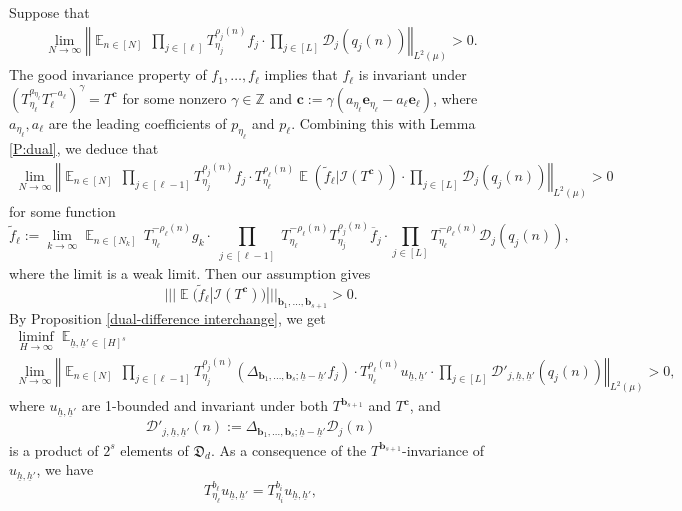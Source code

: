 \documentclass[11pt]{amsart}
\theoremstyle{definition}
\newcommand{\Z}{{\mathbb Z}}
\newcommand{\CD}{{\mathcal D}}
\newcommand{\CI}{{\mathcal I}}
\newcommand{\FD}{{\mathfrak D}}
\newcommand{\bc}{{\mathbf{c}}}
\newcommand{\be}{{\mathbf{e}}}
\renewcommand{\b}{{\textbf{b}}}
\newcommand{\uh}{{\underline{h}}}
\newcommand{\norm}[1]{\left\Vert #1\right\Vert}
\newcommand{\nnorm}[1]{\lvert\!|\!| #1|\!|\!\rvert}
\DeclareMathOperator*{\E}{\mathbb{E}}
\newcommand{\brac}[1]{\mathopen{}\left( #1 \mathclose{}\right)}
\begin{document}
Suppose that
\begin{align}\label{general average is positive 2}
    \lim_{N\to\infty}\norm{\E_{n\in [N]} \,\prod_{j\in[\ell]}T_{{\eta_j}}^{\rho_j(n)}f_j \cdot \prod_{j\in[L]}\CD_{j}(q_j(n))}_{L^2(\mu)}>0.
\end{align}
The good invariance property  of $f_1, \ldots, f_\ell$ implies that $f_\ell$ is invariant under $\brac{T_{\eta_\ell}^{a_{\eta_\ell}}T_\ell^{-a_\ell}}^\gamma = T^{\bc}$ for some nonzero $\gamma\in\Z$ and $\bc := \gamma(a_{\eta_\ell}\be_{\eta_\ell}-a_\ell\be_\ell)$, where $a_{\eta_\ell}, a_\ell$ are the leading coefficients of $p_{\eta_\ell}$ and $p_\ell$.
Combining this with Lemma \ref{P:dual}, we deduce that
\begin{align*}
	\lim_{N\to\infty}\norm{\E_{n\in [N]} \,\prod_{j\in[\ell-1]}T_{{\eta_j}}^{\rho_j(n)}f_j \cdot T_{\eta_\ell}^{\rho_\ell(n)}\E(\tilde{f}_\ell|\CI(T^\bc))\cdot \prod_{j\in[L]}\CD_{j}(q_j(n))}_{L^2(\mu)}>0
\end{align*}
for some function
	\begin{equation*}
	\tilde{f}_\ell:=\lim_{k\to\infty} \E_{n\in [N_k]}
	 \, T_{\eta_\ell}^{-\rho_\ell(n)}g_k\cdot \prod_{\substack{j\in [\ell-1]}}T_{\eta_\ell}^{-\rho_\ell(n)} T_{{\eta_j}}^{\rho_j(n)}\overline{f}_j\cdot \prod_{j\in[L]}T_{\eta_\ell}^{-\rho_\ell(n)}\CD_{j}(q_j(n)),
	\end{equation*}
where the limit is a weak limit. Then our assumption gives
$$
\nnorm{\E(\tilde{f}_\ell|\CI(T^\bc))}_{{\b_1}, \ldots, {\b_{s+1}}}>0.
$$
By Proposition \ref{dual-difference interchange}, we get
\begin{multline*}
\liminf_{H\to\infty}\E_{\uh,\uh'\in [H]^{s}}\\
\lim_{N\to\infty}\norm{\E_{n\in[N]} \, \prod_{j\in[\ell-1]} T_{{\eta_j}}^{\rho_j(n)} (\Delta_{{\b_1}, \ldots, {\b_s}; \uh-\uh'} f_j)\cdot T_{\eta_\ell}^{\rho_\ell(n)}u_{\uh,\uh'}\cdot \prod_{j\in[L]} \CD'_{j, \uh, \uh'}(q_j(n))}_{L^2(\mu)}>0,
\end{multline*}
where $u_{\uh,\uh'}$ are 1-bounded and invariant under both $T^{\b_{s+1}}$ and $T^\bc$, and
\begin{align*}
    \CD'_{j, \uh, \uh'}(n) := \Delta_{{\b_1}, \ldots, {\b_s}; \uh-\uh'}\CD_{j}(n)
\end{align*}
is a product of $2^s$ elements of $\FD_d$.
As a consequence of the $T^{\b_{s+1}}$-invariance of $u_{\uh,\uh'}$, we have
\begin{equation}\label{invariance prop general}
T_{\eta_\ell}^{b_\ell}u_{\uh,\uh'}=T_{\eta_i}^{b_i}u_{\uh,\uh'},
\end{equation}
\end{document}
